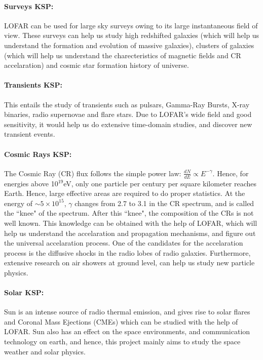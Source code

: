 \documentclass[../main/thesis_msc.tex]{subfiles}
\begin{document}
\paragraph{Surveys KSP:} LOFAR can be used for large sky surveys owing to its large instantaneous field of view. These surveys can help us study high redshifted galaxies (which will help us understand the formation and evolution of massive galaxies), clusters of galaxies (which will help us understand the charecteristics of magnetic fields and CR accelaration) and cosmic star formation history of universe.

\paragraph{Transients KSP:} This entails the study of transients such as pulsars, Gamma-Ray Bursts, X-ray binaries, radio supernovae and flare stars. Due to LOFAR's wide field and good sensitivity, it would help us do extensive time-domain studies, and discover new transient events.

\paragraph{Cosmic Rays KSP:} The Cosmic Ray (CR) flux follows the simple power law: $\frac{dN}{dE} \propto E^{-\gamma}$. Hence, for energies above 10$^{19}$eV, only one particle per century per square kilometer reaches Earth. Hence, large effective areas are required to do proper statistics. At the energy of $\sim 5 \times 10^{15}$, $\gamma$ changes from 2.7 to 3.1 in the CR spectrum, and is called the ``knee" of the spectrum. After this ``knee", the composition of the CRs is not well known. This knowledge can be obtained with the help of LOFAR, which will help us understand the accelaration and propagation mechanisms, and figure out the universal accelaration process. One of the candidates for the accelaration process is the diffusive shocks in the radio lobes of radio galaxies. Furthermore, extensive research on air showers at ground level, can help us study new particle physics.

\paragraph{Solar KSP:} Sun is an intense source of radio thermal emission, and gives rise to solar flares and Coronal Mass Ejections (CMEs) which can be studied with the help of LOFAR. Sun also has an effect on the space environments, and communication technology on earth, and hence, this project mainly aims to study the space weather and solar physics.
\end{document}
